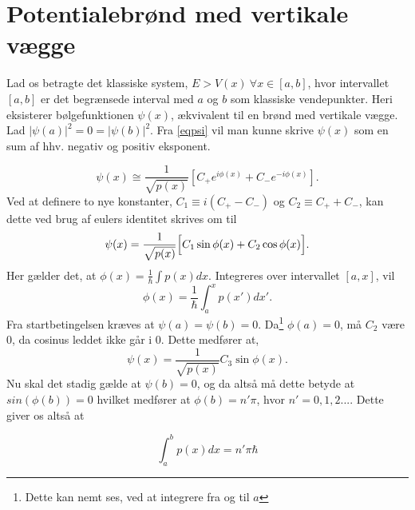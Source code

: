 \section{Potentialebrønd med vertikale vægge}
Lad os betragte det klassiske system, $E > V(x) \ \forall x \in[a,b]$, hvor intervallet $[a,b]$ er det begrænsede interval med $a$ og $b$ som klassiske vendepunkter. Heri eksisterer bølgefunktionen $\psi(x)$, ækvivalent til en brønd med vertikale vægge. Lad $|\psi(a)|^{2} = 0 = |\psi(b)|^{2}$. Fra \cref{eqpsi} vil man kunne skrive $\psi(x)$ som en sum af hhv. negativ og positiv eksponent.

\begin{equation}
    \psi(x) \cong \frac{1}{\sqrt{p(x)}}\left[C_{+}e^{i\phi(x)}+C_{-}e^{-i\phi(x)}\right].
  \label{eq:kvantiseringStart}
\end{equation}
Ved at definere to nye konstanter, $C_1 \equiv i(C_{+}-C_{-})$ og $C_2 \equiv C_{+}+C_{-}$, kan dette ved brug af eulers identitet skrives om til
\begin{equation}
  \psi(x) = \frac{1}{\sqrt{p(x)}}
  \Bigl[    C_1\sin{\phi(x)} + C_2\cos{\phi(x)}   \Bigr].
  \label{eq:kvantiseringSinCos}
\end{equation}
Her gælder det, at $\phi(x) = \frac{1}{\hbar}\int p(x) dx$. Integreres over intervallet $[a, x]$, vil
\begin{equation}
  \phi(x) = \frac{1}{\hbar}\int_{a}^{x} p(x')dx'.
\end{equation}
Fra startbetingelsen kræves at $\psi(a) = \psi(b) = 0$. Da\footnote{Dette kan nemt ses, ved at integrere fra og til $a$} $\phi(a) = 0$, må $C_2$ være 0, da cosinus leddet ikke går i 0. Dette medfører at,
\begin{equation}
    \psi(x) = \frac{1}{\sqrt{p(x)}}C_3\sin{\phi(x)}.
\end{equation}
Nu skal det stadig gælde at $\psi(b) = 0$, og da altså må dette betyde at $sin(\phi(b)) = 0$ hvilket medfører at $\phi(b) = n'\pi$, hvor $n' = 0,1,2...$.
Dette giver os altså at

\begin{equation}
  \int_{a}^{b} p(x) dx = n'\pi\hbar
  \label{eq:kvantiDone}
\end{equation}
